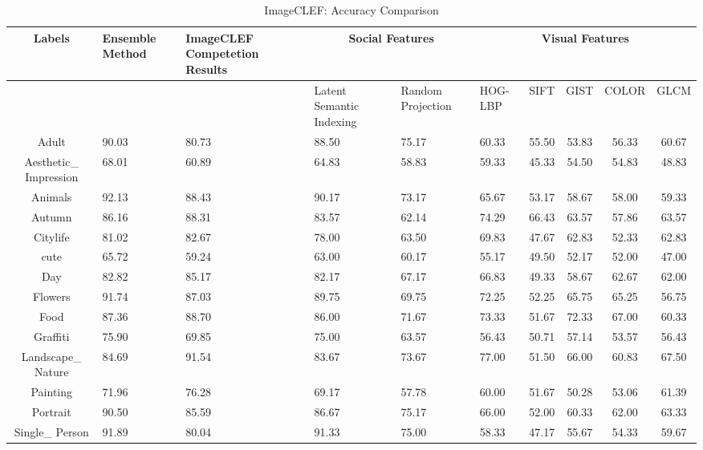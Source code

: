 \newpage
\begin{sidewaystable}
\caption{ ImageCLEF: Accuracy Comparison} %
\vspace*{0.2 cm}
\begin{tabular}{|c| p{2cm}| p{2cm}| p{2cm}| p{2cm}| p{2cm}|c|c|c|c|} %
Labels  & Ensemble Method & ImageCLEF Competetion Results &\multicolumn{2}{c}{Social Features}  &\multicolumn{5}{c}{Visual Features}\\ [0.5ex] \hline %
 &  & & Latent Semantic Indexing & Random Projection & HOG-LBP & SIFT & GIST & COLOR & GLCM \\  [1ex] \hline
Adult & 90.03 & 80.73 & 88.50 & 75.17 & 60.33 & 55.50 & 53.83 & 56.33 & 60.67 \\  [1ex]
Aesthetic\_ Impression & 68.01 & 60.89 & 64.83 & 58.83 & 59.33 & 45.33 & 54.50 & 54.83 & 48.83 \\  [1ex]
Animals & 92.13 & 88.43 & 90.17 & 73.17 & 65.67 & 53.17 & 58.67 & 58.00 & 59.33 \\  [1ex]
Autumn & 86.16 & 88.31 & 83.57 & 62.14 & 74.29 & 66.43 & 63.57 & 57.86 & 63.57 \\  [1ex]
Citylife & 81.02 & 82.67 & 78.00 & 63.50 & 69.83 & 47.67 & 62.83 & 52.33 & 62.83 \\  [1ex]
cute & 65.72 & 59.24 & 63.00 & 60.17 & 55.17 & 49.50 & 52.17 & 52.00 & 47.00 \\  [1ex]
Day & 82.82 & 85.17 & 82.17 & 67.17 & 66.83 & 49.33 & 58.67 & 62.67 & 62.00 \\  [1ex]
Flowers & 91.74 & 87.03 & 89.75 & 69.75 & 72.25 & 52.25 & 65.75 & 65.25 & 56.75 \\  [1ex]
Food & 87.36 & 88.70 & 86.00 & 71.67 & 73.33 & 51.67 & 72.33 & 67.00 & 60.33 \\  [1ex]
Graffiti & 75.90 & 69.85 & 75.00 & 63.57 & 56.43 & 50.71 & 57.14 & 53.57 & 56.43 \\  [1ex]
Landscape\_ Nature & 84.69 & 91.54 & 83.67 & 73.67 & 77.00 & 51.50 & 66.00 & 60.83 & 67.50 \\  [1ex]
Painting & 71.96 & 76.28 & 69.17 & 57.78 & 60.00 & 51.67 & 50.28 & 53.06 & 61.39 \\  [1ex]
Portrait & 90.50 & 85.59 & 86.67 & 75.17 & 66.00 & 52.00 & 60.33 & 62.00 & 63.33 \\  [1ex]
Single\_ Person & 91.89 & 80.04 & 91.33 & 75.00 & 58.33 & 47.17 & 55.67 & 54.33 & 59.67 \\  [1ex]

\end{tabular}
\end{sidewaystable}
